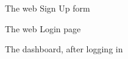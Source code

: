 \documentclass[english]{article}
\begin{document}
\begin{itemize}
\begin{figure}[H]
	\centering
	\caption{The web Sign Up form}
\end{figure}
\begin{figure}[H]
	\centering
	\caption{The web Login page}
\end{figure}
\begin{figure}[H]
	\centering
	\caption{The dashboard, after logging in}
\end{figure}


\end{itemize}
\end{document}
